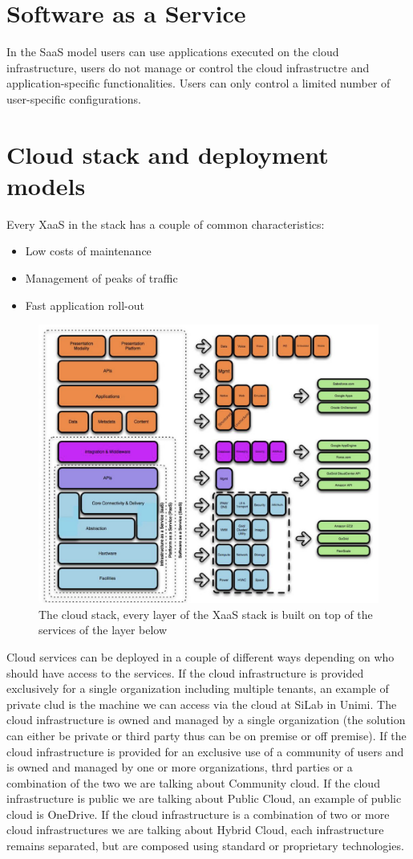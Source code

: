\section{Software as a Service}
In the SaaS model users can use applications executed on the cloud infrastructure, users do not manage or control the cloud infrastructre and application-specific functionalities. Users can only control a limited number of user-specific configurations.
\section{Cloud stack and deployment models}
Every XaaS in the stack has a couple of common characteristics:
\begin{itemize}
    \item Low costs of maintenance
    \item Management of peaks of traffic
    \item Fast application roll-out
\end{itemize}
\begin{figure}
    \centering
    \includegraphics[scale=0.2]{./Images/cloud_stack.jpeg}
    \caption{The cloud stack, every layer of the XaaS stack is built on top of the services of the layer below}
\end{figure}
Cloud services can be deployed in a couple of different ways depending on who should have access to the services. \n
If the cloud infrastructure is provided exclusively for a single organization including multiple tenants, an example of private clud is the machine we can access via the cloud at SiLab in Unimi. The cloud infrastructure is owned and managed by a single organization (the solution can either be private or third party thus can be on premise or off premise). \n
If the cloud infrastructure is provided for an exclusive use of a community of users and is owned and managed by one or more organizations, thrd parties or a combination of the two we are talking about Community cloud. \n
If the cloud infrastructure is public we are talking about Public Cloud, an example of public cloud is OneDrive. \n
If the cloud infrastructure is a combination of two or more cloud infrastructures we are talking about Hybrid Cloud, each infrastructure remains separated, but are composed using standard or proprietary technologies. \n